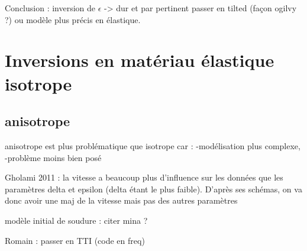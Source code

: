  Conclusion : inversion de $\epsilon$ -> dur et par pertinent
passer en tilted (façon ogilvy ?) ou modèle plus précis en élastique.

\section{Inversions en matériau élastique isotrope}




\subsection{anisotrope}

anisotrope est plus problématique que isotrope car : 
-modélisation plus complexe,
-problème moins bien posé

Gholami 2011 : la vitesse a beaucoup plus d'influence sur les données que les paramètres delta et epsilon (delta étant le plus faible). D'après ses schémas, on va donc avoir une maj de la vitesse mais pas des autres paramètres

modèle initial de soudure : citer mina ?



Romain : passer en TTI (code en freq)

